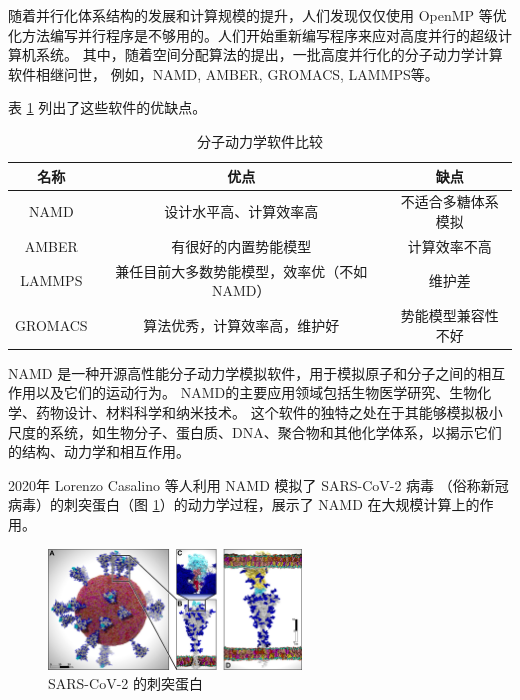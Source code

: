 随着并行化体系结构的发展和计算规模的提升，人们发现仅仅使用 OpenMP 等优化方法编写并行程序是不够用的。人们开始重新编写程序来应对高度并行的超级计算机系统。
其中，随着空间分配算法\cite{brown1993domain}的提出，一批高度并行化的分子动力学计算软件相继问世，
例如，NAMD\cite{phillips2005scalable}, AMBER\cite{case2008amber}, GROMACS\cite{abraham2015gromacs}, LAMMPS\cite{thompson2022lammps}等。

表 \ref{tab:md-comparison} 列出了这些软件的优缺点。

\begin{table}[h]
    \centering
    \caption{分子动力学软件比较}
    \label{tab:md-comparison}
    \begin{tabular}{ccc}
        \toprule
        名称      & 优点                       & 缺点        \\
        \midrule
        NAMD    & 设计水平高、计算效率高              & 不适合多糖体系模拟 \\
        AMBER   & 有很好的内置势能模型               & 计算效率不高    \\
        LAMMPS  & 兼任目前大多数势能模型，效率优（不如 NAMD） & 维护差       \\
        GROMACS & 算法优秀，计算效率高，维护好           & 势能模型兼容性不好 \\
        \bottomrule
    \end{tabular}
\end{table}

NAMD 是一种开源高性能分子动力学模拟软件，用于模拟原子和分子之间的相互作用以及它们的运动行为。
NAMD的主要应用领域包括生物医学研究\cite{yao2020molecular}、生物化学\cite{knott2020characterization}、药物设计\cite{han2020computational}、材料科学和纳米技术。
这个软件的独特之处在于其能够模拟极小尺度的系统，如生物分子、蛋白质、DNA、聚合物和其他化学体系，以揭示它们的结构、动力学和相互作用。

2020年 Lorenzo Casalino 等人利用 NAMD 模拟了 SARS-CoV-2 病毒 （俗称新冠病毒）的刺突蛋白（图 \ref{fig:sars-cov-2-spike}）的动力学过程\cite{casalino2021ai}，展示了 NAMD 在大规模计算上的作用。

\begin{figure}[h]
    \centering
    \includegraphics[width=0.6\textwidth]{images/spike.jpeg}
    \caption{SARS-CoV-2 的刺突蛋白}
    \label{fig:sars-cov-2-spike}
\end{figure}


